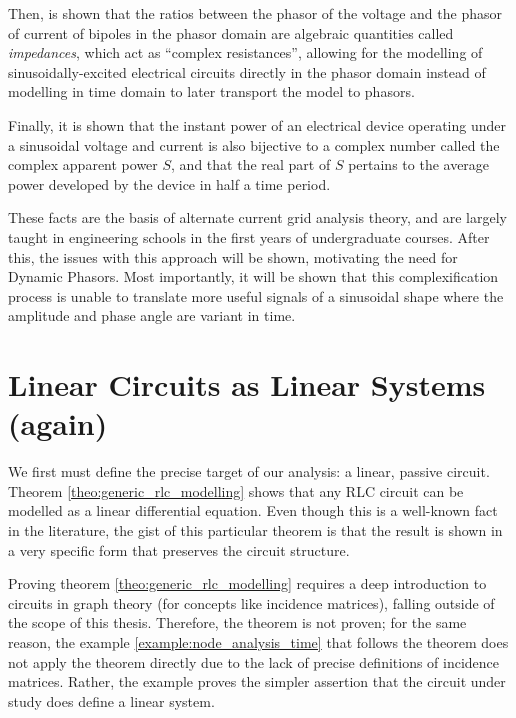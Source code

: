 	Then, is shown that the ratios between the phasor of the voltage and the phasor of current of bipoles in the phasor domain are algebraic quantities called \textit{impedances}, which act as ``complex resistances'', allowing for the modelling of sinusoidally-excited electrical circuits directly in the phasor domain instead of modelling in time domain to later transport the model to phasors.

	Finally, it is shown that the instant power of an electrical device operating under a sinusoidal voltage and current is also bijective to a complex number called the complex apparent power $S$, and that the real part of $S$ pertains to the average power developed by the device in half a time period.

	These facts are the basis of alternate current grid analysis theory, and are largely taught in engineering schools in the first years of undergraduate courses. After this, the issues with this approach will be shown, motivating the need for Dynamic Phasors. Most importantly, it will be shown that this complexification process is unable to translate more useful signals of a sinusoidal shape where the amplitude and phase angle are variant in time.

\section{Linear Circuits as Linear Systems (again)} %

	We first must define the precise target of our analysis: a linear, passive circuit. Theorem \ref{theo:generic_rlc_modelling} shows that any RLC circuit can be modelled as a linear differential equation. Even though this is a well-known fact in the literature, the gist of this particular theorem is that the result is shown in a very specific form that preserves the circuit structure.

	Proving theorem \ref{theo:generic_rlc_modelling} requires a deep introduction to circuits in graph theory (for concepts like incidence matrices), falling outside of the scope of this thesis. Therefore, the theorem is not proven; for the same reason, the example \ref{example:node_analysis_time} that follows the theorem does not apply the theorem directly due to the lack of precise definitions of incidence matrices. Rather, the example proves the simpler assertion that the circuit under study does define a linear system.

